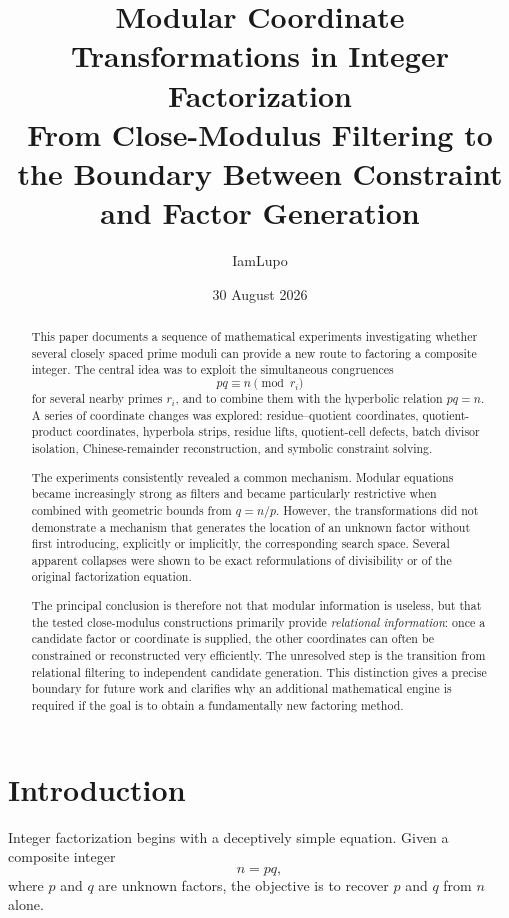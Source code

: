 \documentclass[11pt,a4paper]{article}
\title{\textbf{Modular Coordinate Transformations in Integer Factorization}\\
\large From Close-Modulus Filtering to the Boundary Between Constraint and Factor Generation}
\author{IamLupo}
\date{30 August 2026}
\begin{document}
\maketitle

\begin{abstract}
This paper documents a sequence of mathematical experiments investigating whether several closely spaced prime moduli can provide a new route to factoring a composite integer. The central idea was to exploit the simultaneous congruences
\[
    pq \equiv n \pmod{r_i}
\]
for several nearby primes $r_i$, and to combine them with the hyperbolic relation $pq=n$. A series of coordinate changes was explored: residue--quotient coordinates, quotient-product coordinates, hyperbola strips, residue lifts, quotient-cell defects, batch divisor isolation, Chinese-remainder reconstruction, and symbolic constraint solving.

The experiments consistently revealed a common mechanism. Modular equations became increasingly strong as filters and became particularly restrictive when combined with geometric bounds from $q=n/p$. However, the transformations did not demonstrate a mechanism that generates the location of an unknown factor without first introducing, explicitly or implicitly, the corresponding search space. Several apparent collapses were shown to be exact reformulations of divisibility or of the original factorization equation.

The principal conclusion is therefore not that modular information is useless, but that the tested close-modulus constructions primarily provide \emph{relational information}: once a candidate factor or coordinate is supplied, the other coordinates can often be constrained or reconstructed very efficiently. The unresolved step is the transition from relational filtering to independent candidate generation. This distinction gives a precise boundary for future work and clarifies why an additional mathematical engine is required if the goal is to obtain a fundamentally new factoring method.
\end{abstract}

\tableofcontents
\newpage

\section{Introduction}

Integer factorization begins with a deceptively simple equation. Given a composite integer
\[
    n=pq,
\]
where $p$ and $q$ are unknown factors, the objective is to recover $p$ and $q$ from $n$ alone.
\end{document}
